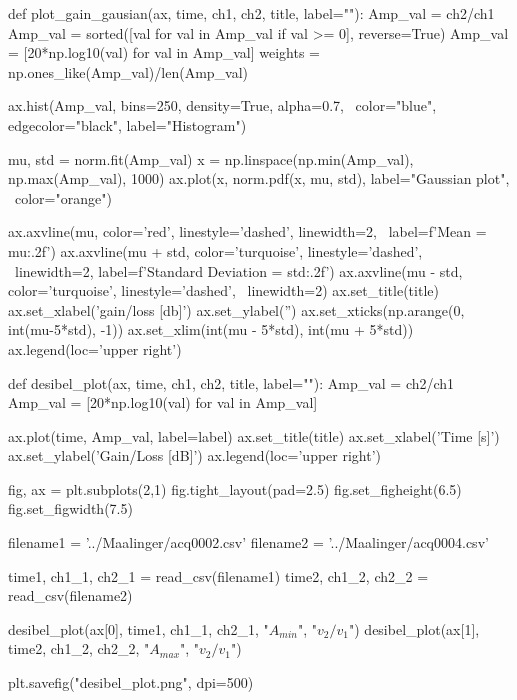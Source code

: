 \begin{pythoncode}
def plot_gain_gausian(ax, time, ch1, ch2, title, label=""):
    Amp_val = ch2/ch1
    Amp_val = sorted([val for val in Amp_val if val >= 0], reverse=True)
    Amp_val = [20*np.log10(val) for val in Amp_val]
    weights = np.ones_like(Amp_val)/len(Amp_val)

    ax.hist(Amp_val, bins=250, density=True, alpha=0.7, \
        color="blue", edgecolor="black", label="Histogram")
    
    mu, std = norm.fit(Amp_val)
    x = np.linspace(np.min(Amp_val), np.max(Amp_val), 1000)
    ax.plot(x, norm.pdf(x, mu, std), label="Gaussian plot", \
        color="orange")

    ax.axvline(mu, color='red', linestyle='dashed', linewidth=2, \
        label=f'Mean = {mu:.2f}')
    ax.axvline(mu + std, color='turquoise', linestyle='dashed', \
        linewidth=2, label=f'Standard Deviation = {std:.2f}')
    ax.axvline(mu - std, color='turquoise', linestyle='dashed', \
        linewidth=2)
    ax.set_title(title)
    ax.set_xlabel('gain/loss [db]')
    ax.set_ylabel('')
    ax.set_xticks(np.arange(0, int(mu-5*std), -1))
    ax.set_xlim(int(mu - 5*std), int(mu + 5*std))
    ax.legend(loc='upper right')

def desibel_plot(ax, time, ch1, ch2, title, label=""):
    Amp_val = ch2/ch1
    Amp_val = [20*np.log10(val) for val in Amp_val]
    
    ax.plot(time, Amp_val, label=label)
    ax.set_title(title)
    ax.set_xlabel('Time [s]')
    ax.set_ylabel('Gain/Loss [dB]')
    ax.legend(loc='upper right')

fig, ax = plt.subplots(2,1)
fig.tight_layout(pad=2.5)
fig.set_figheight(6.5)
fig.set_figwidth(7.5)

filename1 = '../Maalinger/acq0002.csv'
filename2 = '../Maalinger/acq0004.csv'

time1, ch1_1, ch2_1 = read_csv(filename1)
time2, ch1_2, ch2_2 = read_csv(filename2)

desibel_plot(ax[0], time1, ch1_1, ch2_1, "$A_{min}$", "$v_2/v_1$")
desibel_plot(ax[1], time2, ch1_2, ch2_2, "$A_{max}$", "$v_2/v_1$")

plt.savefig("desibel_plot.png", dpi=500) 
\end{pythoncode}
